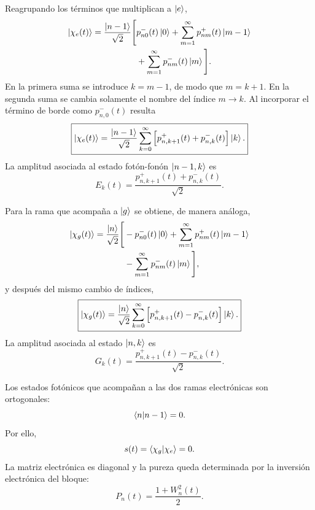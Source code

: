 \documentclass[11pt]{article}
\begin{document}
Reagrupando los t\'erminos que multiplican a $\ket e$,
\begin{equation}
\begin{aligned}
  \ket{\chi_e(t)}
  =
  \frac{\ket{n-1}}{\sqrt2}
  \Bigg[
  &p_{n0}^{-}(t)\ket0
  +
  \sum_{m=1}^{\infty}p_{nm}^{+}(t)\ket{m-1}
  \\
  &+
  \sum_{m=1}^{\infty}p_{nm}^{-}(t)\ket m
  \Bigg].
\end{aligned}
\end{equation}
En la primera suma se introduce $k=m-1$, de modo que $m=k+1$. En la segunda
suma se cambia solamente el nombre del \'indice $m\to k$. Al incorporar el
t\'ermino de borde como $p_{n,0}^{-}(t)$ resulta
\begin{equation}
  \boxed{
  \ket{\chi_e(t)}
  =
  \frac{\ket{n-1}}{\sqrt2}
  \sum_{k=0}^{\infty}
  \left[
  p_{n,k+1}^{+}(t)+p_{n,k}^{-}(t)
  \right]
  \ket k.
  }
\end{equation}
La amplitud asociada al estado fot\'on-fon\'on $\ket{n-1,k}$ es
\begin{equation}
  E_k(t)
  =
  \frac{p_{n,k+1}^{+}(t)+p_{n,k}^{-}(t)}{\sqrt2}.
\end{equation}

Para la rama que acompa\~na a $\ket g$ se obtiene, de manera an\'aloga,
\begin{equation}
\begin{aligned}
  \ket{\chi_g(t)}
  =
  \frac{\ket n}{\sqrt2}
  \Bigg[
  &-p_{n0}^{-}(t)\ket0
  +
  \sum_{m=1}^{\infty}p_{nm}^{+}(t)\ket{m-1}
  \\
  &-
  \sum_{m=1}^{\infty}p_{nm}^{-}(t)\ket m
  \Bigg],
\end{aligned}
\end{equation}
y despu\'es del mismo cambio de \'indices,
\begin{equation}
  \boxed{
  \ket{\chi_g(t)}
  =
  \frac{\ket n}{\sqrt2}
  \sum_{k=0}^{\infty}
  \left[
  p_{n,k+1}^{+}(t)-p_{n,k}^{-}(t)
  \right]
  \ket k.
  }
\end{equation}
La amplitud asociada al estado $\ket{n,k}$ es
\begin{equation}
  G_k(t)
  =
  \frac{p_{n,k+1}^{+}(t)-p_{n,k}^{-}(t)}{\sqrt2}.
\end{equation}

Los estados fot\'onicos que acompa\~nan a las dos ramas electr\'onicas son
ortogonales:
\begin{equation}
  \braket{n|n-1}=0.
\end{equation}
Por ello,
\begin{equation}
  s(t)=\braket{\chi_g|\chi_e}=0.
\end{equation}
La matriz electr\'onica es diagonal y la pureza queda determinada por la
inversi\'on electr\'onica del bloque:
\begin{equation}
  \boxed{
  P_n(t)
  =
  \frac{1+W_n^2(t)}{2}.
  }
\end{equation}
\end{document}
